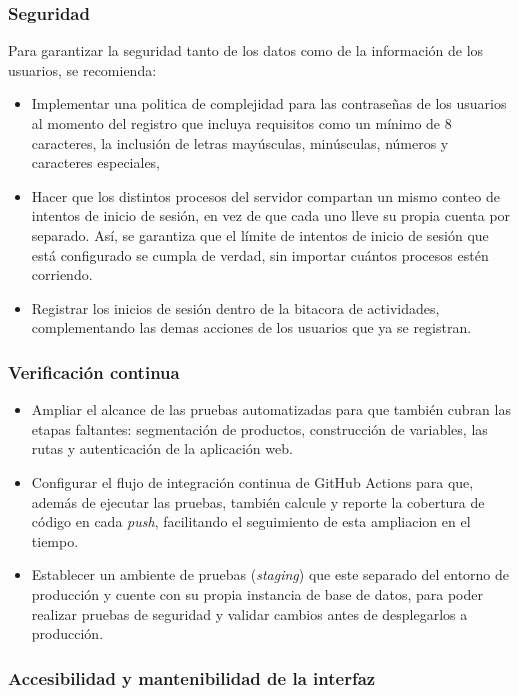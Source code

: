 \subsubsection{Seguridad}

Para garantizar la seguridad tanto de los datos como de la información de los usuarios, se recomienda: 

\begin{itemize}
    \item Implementar una politica de complejidad para las contraseñas de los usuarios al momento del registro que incluya requisitos como un mínimo de 8 caracteres, la inclusión de letras mayúsculas, minúsculas, números y caracteres especiales, 
    \item Hacer que los distintos procesos del servidor compartan un mismo conteo de intentos de inicio de sesión, en vez de que cada uno lleve su propia cuenta por separado. Así, se garantiza que el límite de intentos de inicio de sesión que está configurado se cumpla de verdad, sin importar cuántos procesos estén corriendo.
    \item Registrar los inicios de sesión dentro de la bitacora de actividades, complementando las demas acciones de los usuarios que ya se registran.
\end{itemize}

\subsubsection{Verificación continua}

\begin{itemize}
    \item Ampliar el alcance de las pruebas automatizadas para que también cubran las etapas faltantes: segmentación de productos, construcción de variables, las rutas y autenticación de la aplicación web.
    \item Configurar el flujo de integración continua de GitHub Actions para que, además de ejecutar las pruebas, también calcule y reporte la cobertura de código en cada \textit{push}, facilitando el seguimiento de esta ampliacion en el tiempo.
    \item Establecer un ambiente de pruebas (\textit{staging}) que este separado del entorno de producción y cuente con su propia instancia de base de datos, para poder realizar pruebas de seguridad y validar cambios antes de desplegarlos a producción.
\end{itemize}

\subsubsection{Accesibilidad y mantenibilidad de la interfaz}

